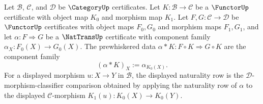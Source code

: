\begin{definition}
\label{def:prewhiskered-nattrans-certificate-data}
Let $\mathcal B$, $\mathcal C$, and $\mathcal D$ be $\CategoryUp$ certificates. Let $K:\mathcal B\to\mathcal C$ be a $\FunctorUp$ certificate with object map $K_0$ and morphism map $K_1$. Let $F,G:\mathcal C\to\mathcal D$ be $\FunctorUp$ certificates with object maps $F_0,G_0$ and morphism maps $F_1,G_1$, and let $\alpha:F\Rightarrow G$ be a $\NatTransUp$ certificate with component family $\alpha_X:F_0(X)\to G_0(X)$. The prewhiskered data $\alpha\ast K:F\circ K\Rightarrow G\circ K$ are the component family
$$
(\alpha\ast K)_X:=\alpha_{K_0(X)}.
$$
For a displayed morphism $u:X\to Y$ in $\mathcal B$, the displayed naturality row is the $\mathcal D$-morphism-classifier comparison obtained by applying the naturality row of $\alpha$ to the displayed $\mathcal C$-morphism $K_1(u):K_0(X)\to K_0(Y)$.
\end{definition}

